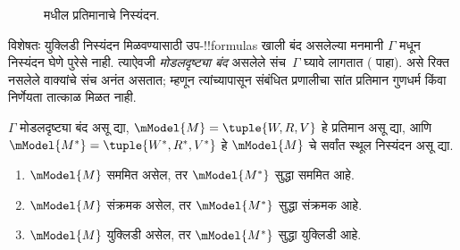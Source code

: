 \documentclass[../../../include/open-logic-section]{subfiles}
\begin{document}
\begin{figure}[ht]
  \centering
  \caption{ मधील प्रतिमानाचे निस्यंदन.}
\end{figure}

विशेषतः युक्लिडी निस्यंदन मिळवण्यासाठी
उप-!!{formula}s खाली बंद असलेल्या मनमानी $\Gamma$
मधून निस्यंदन घेणे पुरेसे नाही. त्याऐवजी
\emph{मोडलदृष्ट्या बंद} असलेले संच~$\Gamma$
घ्यावे लागतात ( पाहा).
असे रिक्त नसलेले वाक्यांचे संच अनंत असतात; म्हणून त्यांच्यापासून
संबंधित प्रणालीचा सांत प्रतिमान गुणधर्म किंवा
निर्णेयता तात्काळ मिळत नाही.

\begin{thm}
  $\Gamma$ मोडलदृष्ट्या बंद असू द्या,
  $\mModel{M}=\tuple{W,R,V}$ हे प्रतिमान असू द्या,
  आणि $\mModel{M^*} = \tuple{W^*,R^*,V^*}$ हे
  $\mModel{M}$ चे सर्वांत स्थूल निस्यंदन असू द्या.
  \begin{enumerate}
  \item $\mModel{M}$ सममित असेल, तर $\mModel{M^*}$ सुद्धा सममित आहे.
  \item $\mModel{M}$ संक्रमक असेल, तर $\mModel{M^*}$ सुद्धा संक्रमक आहे.
  \item $\mModel{M}$ युक्लिडी असेल, तर $\mModel{M^*}$ सुद्धा युक्लिडी आहे.
  \end{enumerate}
\end{thm}
\end{document}
